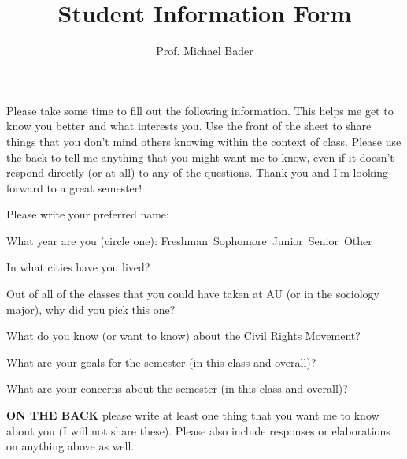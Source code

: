 \documentclass[12pt]{homework}
\title{Student Information Form}
\author{Prof. Michael Bader}
\begin{document}
\maketitle 
\noindent Please take some time to fill out the following information. This helps me get to know you better and what interests you. Use the front of the sheet to share things that you don't mind others knowing within the context of class. Please use the back to tell me anything that you might want me to know, even if it doesn't respond directly (or at all) to any of the questions. Thank you and I'm looking forward to a great semester!


\begin{questions}
\question Please write your preferred name:

\question What year are you (circle one): Freshman\, Sophomore\, Junior\, Senior\, Other


\question In what cities have you lived? 
\begin{solution}[.5in]\end{solution}

\question Out of all of the classes that you could have taken at AU (or in the sociology major), why did you pick this one? 
\begin{solution}[.5in]\end{solution}

\question What do you know (or want to know) about the Civil Rights Movement?
\begin{solution}[.5in]\end{solution}

\question What are your goals for the semester (in this class and overall)? 
\begin{solution}[.5in]\end{solution}

\question What are your concerns about the semester (in this class and overall)?
\begin{solution}[.5in]\end{solution}

\question \textbf{ON THE BACK} please write at least one thing that you want me to know about you (I will not share these). Please also include responses or elaborations on anything above as well. 



\end{questions}
\end{document}
